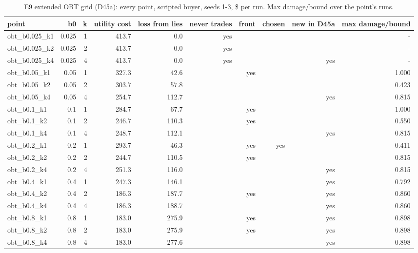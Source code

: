 \begin{table}[t]
\centering
\small
\caption{E9 extended OBT grid (D45a): every point, scripted buyer, seeds 1-3, \$ per run. Max damage/bound over the point's runs.}
\label{tab:e9_calibration_ext_grid}
\begin{tabular}{lrrrrrrrrr}
\toprule
point & b0 & k & utility cost & loss from lies & never trades & front & chosen & new in D45a & max damage/bound \\
\midrule
obt\_b0.025\_k1 & 0.025 & 1 & 413.7 & 0.0 & yes &  &  &  & - \\
obt\_b0.025\_k2 & 0.025 & 2 & 413.7 & 0.0 & yes &  &  &  & - \\
obt\_b0.025\_k4 & 0.025 & 4 & 413.7 & 0.0 & yes &  &  & yes & - \\
obt\_b0.05\_k1 & 0.05 & 1 & 327.3 & 42.6 &  & yes &  &  & 1.000 \\
obt\_b0.05\_k2 & 0.05 & 2 & 303.7 & 57.8 &  &  &  &  & 0.423 \\
obt\_b0.05\_k4 & 0.05 & 4 & 254.7 & 112.7 &  &  &  & yes & 0.815 \\
obt\_b0.1\_k1 & 0.1 & 1 & 284.7 & 67.7 &  & yes &  &  & 1.000 \\
obt\_b0.1\_k2 & 0.1 & 2 & 246.7 & 110.3 &  & yes &  &  & 0.550 \\
obt\_b0.1\_k4 & 0.1 & 4 & 248.7 & 112.1 &  &  &  & yes & 0.815 \\
obt\_b0.2\_k1 & 0.2 & 1 & 293.7 & 46.3 &  & yes & yes &  & 0.411 \\
obt\_b0.2\_k2 & 0.2 & 2 & 244.7 & 110.5 &  & yes &  &  & 0.815 \\
obt\_b0.2\_k4 & 0.2 & 4 & 251.3 & 116.0 &  &  &  & yes & 0.815 \\
obt\_b0.4\_k1 & 0.4 & 1 & 247.3 & 146.1 &  &  &  & yes & 0.792 \\
obt\_b0.4\_k2 & 0.4 & 2 & 186.3 & 187.7 &  & yes &  & yes & 0.860 \\
obt\_b0.4\_k4 & 0.4 & 4 & 186.3 & 188.7 &  &  &  & yes & 0.860 \\
obt\_b0.8\_k1 & 0.8 & 1 & 183.0 & 275.9 &  & yes &  & yes & 0.898 \\
obt\_b0.8\_k2 & 0.8 & 2 & 183.0 & 275.9 &  & yes &  & yes & 0.898 \\
obt\_b0.8\_k4 & 0.8 & 4 & 183.0 & 277.6 &  &  &  & yes & 0.898 \\
\bottomrule
\end{tabular}
\end{table}
